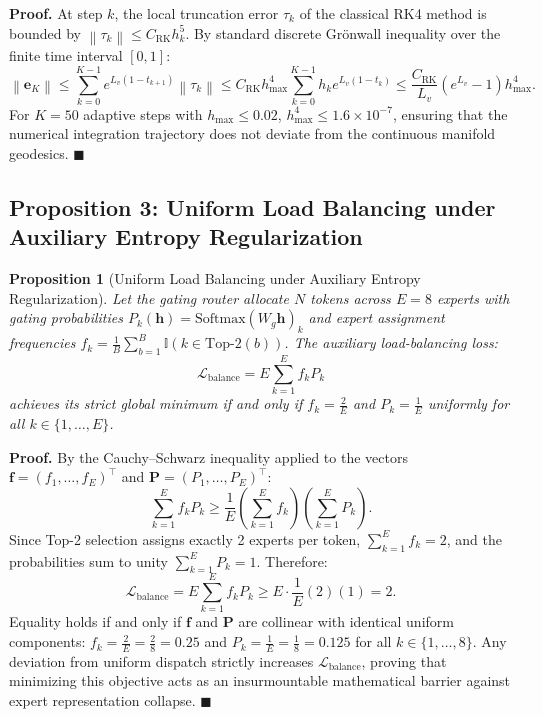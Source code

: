 \documentclass[11pt,a4paper]{article}
\newtheorem{proposition}{Proposition}
\begin{document}
\noindent\textbf{Proof.} At step $k$, the local truncation error $\tau_k$ of the classical RK4 method is bounded by $\left\| \tau_k \right\| \le C_{\text{RK}} h_k^5$. By standard discrete Gr{\"o}nwall inequality over the finite time interval $[0, 1]$:
\begin{equation}
\left\| \mathbf{e}_K \right\| \le \sum_{k=0}^{K-1} e^{L_v (1 - t_{k+1})} \left\| \tau_k \right\| \le C_{\text{RK}} h_{\max}^4 \sum_{k=0}^{K-1} h_k e^{L_v(1 - t_k)} \le \frac{C_{\text{RK}}}{L_v} \left( e^{L_v} - 1 \right) h_{\max}^4.
\end{equation}
For $K = 50$ adaptive steps with $h_{\max} \le 0.02$, $h_{\max}^4 \le 1.6 \times 10^{-7}$, ensuring that the numerical integration trajectory does not deviate from the continuous manifold geodesics. \hfill $\blacksquare$

\vspace{1em}

\subsection*{Proposition 3: Uniform Load Balancing under Auxiliary Entropy Regularization}
\begin{proposition}[Uniform Load Balancing under Auxiliary Entropy Regularization]
Let the gating router allocate $N$ tokens across $E = 8$ experts with gating probabilities $P_k(\mathbf{h}) = \text{Softmax}(W_g \mathbf{h})_k$ and expert assignment frequencies $f_k = \frac{1}{B} \sum_{b=1}^B \mathbb{I}(k \in \text{Top-2}(b))$. The auxiliary load-balancing loss:
\begin{equation}
\mathcal{L}_{\text{balance}} = E \sum_{k=1}^E f_k P_k
\end{equation}
achieves its strict global minimum if and only if $f_k = \frac{2}{E}$ and $P_k = \frac{1}{E}$ uniformly for all $k \in \{1, \dots, E\}$.
\end{proposition}

\noindent\textbf{Proof.} By the Cauchy--Schwarz inequality applied to the vectors $\mathbf{f} = (f_1, \dots, f_E)^\top$ and $\mathbf{P} = (P_1, \dots, P_E)^\top$:
\begin{equation}
\sum_{k=1}^E f_k P_k \ge \frac{1}{E} \left( \sum_{k=1}^E f_k \right) \left( \sum_{k=1}^E P_k \right).
\end{equation}
Since Top-2 selection assigns exactly 2 experts per token, $\sum_{k=1}^E f_k = 2$, and the probabilities sum to unity $\sum_{k=1}^E P_k = 1$. Therefore:
\begin{equation}
\mathcal{L}_{\text{balance}} = E \sum_{k=1}^E f_k P_k \ge E \cdot \frac{1}{E} (2)(1) = 2.
\end{equation}
Equality holds if and only if $\mathbf{f}$ and $\mathbf{P}$ are collinear with identical uniform components: $f_k = \frac{2}{E} = \frac{2}{8} = 0.25$ and $P_k = \frac{1}{E} = \frac{1}{8} = 0.125$ for all $k \in \{1, \dots, 8\}$. Any deviation from uniform dispatch strictly increases $\mathcal{L}_{\text{balance}}$, proving that minimizing this objective acts as an insurmountable mathematical barrier against expert representation collapse. \hfill $\blacksquare$
\end{document}
